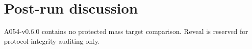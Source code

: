 \section*{Post-run discussion}
A054-v0.6.0 contains no protected mass target comparison. Reveal is reserved for protocol-integrity auditing only.
